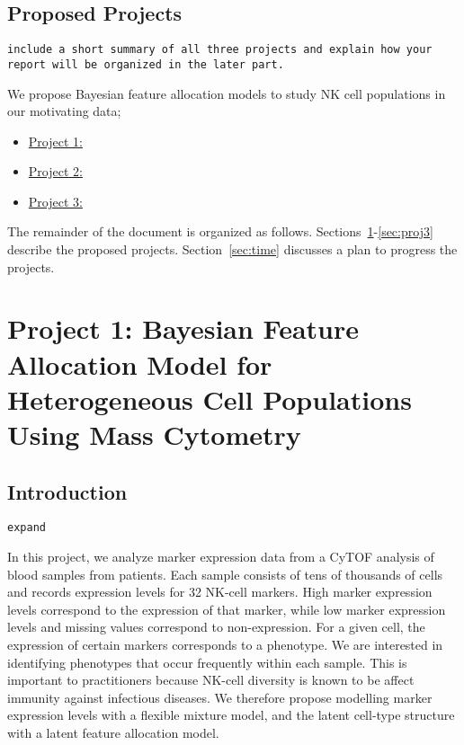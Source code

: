 \documentclass[12pt,]{article}
\begin{document}
\subsection{Proposed Projects}
{\tt include a short summary of all three projects and explain how your report
will be organized in the later part.}

We propose Bayesian feature allocation models to study NK cell populations in our motivating data;
\begin{itemize}
\item \underline{Project 1:}

\item \underline{Project 2:}

\item \underline{Project 3:}

\end{itemize} 
The remainder of the document is organized as follows. Sections~\ref{sec:proj1}-\ref{sec:proj3} describe the proposed projects. Section~\ref{sec:time} discusses a plan to progress the projects.  





\section{Project 1: Bayesian Feature Allocation Model for Heterogeneous Cell Populations Using Mass Cytometry}\label{sec:proj1}
\subsection{Introduction}

{\tt expand} 

In this project, we analyze marker expression data from a CyTOF analysis of
blood samples from patients. Each sample consists of tens of thousands of cells
and records expression levels for 32 NK-cell markers. High marker expression
levels correspond to the expression of that marker, while low marker expression
levels and missing values correspond to non-expression. For a given cell, the
expression of certain markers corresponds to a phenotype. We are interested in
identifying phenotypes that occur frequently within each sample. This is
important to practitioners because NK-cell diversity is known to be affect
immunity against infectious diseases. We therefore propose modelling marker
expression levels with a flexible mixture model, and the latent cell-type
structure with a latent feature allocation model.
\end{document}
